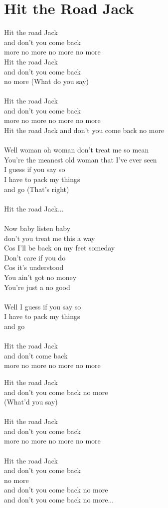 \section{Hit the Road Jack}
Hit the road Jack\\
and don't you come back\\
more no more no more no more\\
Hit the road Jack\\
and don't you come back\\
no more (What do you say)\\
\\
Hit the road Jack\\
and don't you come back\\
more no more no more no more\\
Hit the road Jack
and don't you come back no more\\
\\
Well woman oh woman don't treat me so mean\\
You're the meanest old woman that I've ever seen\\
I guess if you say so\\
I have to pack my things\\
and go (That's right)\\
\\
Hit the road Jack...\\
\\
Now baby listen baby\\
don't you treat me this a way\\
Cos I'll be back on my feet someday\\
Don't care if you do\\
Cos it's understood\\
You ain't got no money\\
You're just a no good\\
\\
Well I guess if you say so\\
I have to pack my things\\
and go\\
\\
Hit the road Jack\\
and don't come back\\
more no more no more no more\\
\begin{multicols}{2}
Hit the road Jack\\
and don't you come back no more \\
(What'd you say)\\
\\
Hit the road Jack\\
and don't you come back\\
more no more no more no more\\
\columnbreak
\\
Hit the road Jack\\
and don't you come back\\
no more \\
and don't you come back no more\\
and don't you come back no more...
\end{multicols}
